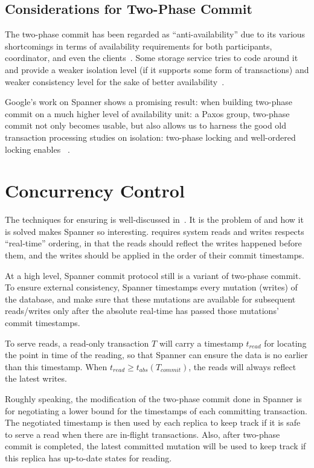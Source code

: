 \subsection{Considerations for Two-Phase Commit}
The two-phase commit has been regarded as ``anti-availability'' due to its
various shortcomings in terms of availability requirements for both
participants, coordinator, and even the clients~\cite{helland2007life}.
Some storage service tries to code around it and provide a weaker isolation
level (if it supports some form of transactions) and weaker consistency
level for the sake of better availability~\cite{gilbert2002brewer}.

Google's work on Spanner shows a promising result: when building two-phase
commit on a much higher level of availability unit: a Paxos group, two-phase
commit not only becomes usable, but also allows us to harness the good old
transaction processing studies on isolation: two-phase locking and well-ordered locking enables {\Sconsistent}~\cite{gray1992transaction}.


\section{Concurrency Control}
The techniques for ensuring {\Sconsistent} is well-discussed in~\cite{gray1992transaction}.
It is the problem of {\Lconsistent} and how it is solved makes Spanner so
interesting. {\Lconsistent} requires system reads and
writes respects ``real-time'' ordering, in that the reads should reflect the
writes happened before them, and the writes should be applied in the order of
their commit timestamps.

At a high level, Spanner commit protocol still is a variant of two-phase
commit. To ensure external consistency, Spanner timestamps every
mutation (writes) of the database, and make sure that these mutations
are available for subsequent reads/writes only after the absolute real-time
has passed those mutations' commit timestamps.

To serve reads, a read-only transaction $T$ will carry a timestamp $t_{
read}$ for locating the point in time of the reading, so that Spanner can
ensure the data is no earlier than this timestamp. When $t_{read} \ge
t_{abs}(T_{commit})$, the reads will always reflect the latest writes.

Roughly speaking, the modification of the two-phase commit done in Spanner is
for negotiating a lower bound for the timestamps of each committing
transaction. The negotiated timestamp is then used by each replica to keep
track if it is safe to serve a read when there are in-flight transactions.
Also, after two-phase commit is completed, the latest committed mutation will
be used to keep track if this replica has up-to-date states for reading.

